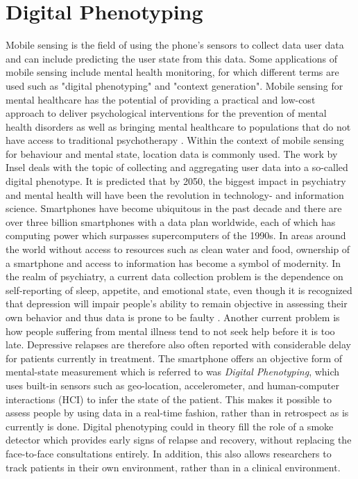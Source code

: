 \section{Digital Phenotyping}
Mobile sensing is the field of using the phone's sensors to collect data user data and can include predicting the user state from this data. Some applications of mobile sensing include mental health monitoring, for which different terms are used such as "digital phenotyping" and "context generation". Mobile sensing for mental healthcare has the potential of providing a practical and low-cost approach to deliver psychological interventions for the prevention of mental health disorders \cite{mobile-based-interventions} as well as bringing mental healthcare to populations that do not have access to traditional psychotherapy \cite{future-mental-health}. Within the context of mobile sensing for behaviour and mental state, location data is commonly used. The work by Insel \cite{digital_phenotyping} deals with the topic of collecting and aggregating user data into a so-called digital phenotype. It is predicted that by 2050, the biggest impact in psychiatry and mental health will have been the revolution in technology- and information science. Smartphones have become ubiquitous in the past decade and there are over three billion smartphones with a data plan worldwide, each of which has computing power which surpasses supercomputers of the 1990s. In areas around the world without access to resources such as clean water and food, ownership of a smartphone and access to information has become a symbol of modernity. In the realm of psychiatry, a current data collection problem is the dependence on self-reporting of sleep, appetite, and emotional state, even though it is recognized that depression will impair people's ability to remain objective in assessing their own behavior and thus data is prone to be faulty \cite{digital_phenotyping}. Another current problem is how people suffering from mental illness tend to not seek help before it is too late. Depressive relapses are therefore also often reported with considerable delay for patients currently in treatment. The smartphone offers an objective form of mental-state measurement which is referred to was \textit{Digital Phenotyping}, which uses built-in sensors such as geo-location, accelerometer, and human-computer interactions (HCI) to infer the state of the patient. This makes it possible to assess people by using data in a real-time fashion, rather than in retrospect as is currently is done. Digital phenotyping could in theory fill the role of a smoke detector which provides early signs of relapse and recovery, without replacing the face-to-face consultations entirely. In addition, this also allows researchers to track patients in their own environment, rather than in a clinical environment.
